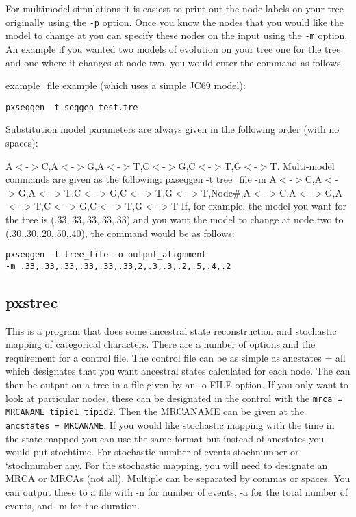 \documentclass[12pt,letterpaper]{memoir}
\begin{document}
For multimodel simulations it is easiest to print out the node labels on your tree originally using the \texttt{-p} option. Once you know the nodes that you would like the model to change at you can specify these nodes on the input using the \texttt{-m} option. An example if you wanted two models of evolution on your tree one for the tree and one where it changes at node two, you would enter the command as follows.


\begin{flushleft}
example\_file example (which uses a simple JC69 model):
\begin{verbatim}
pxseqgen -t seqgen_test.tre
\end{verbatim}

Substitution model parameters are always given in the following order (with no spaces):

A$<$-$>$C,A$<$-$>$G,A$<$-$>$T,C$<$-$>$G,C$<$-$>$T,G$<$-$>$T.
\newline
\newline
Multi-model commands are given as the following:
pxseqgen -t tree\_file -m A$<$-$>$C,A$<$-$>$G,A$<$-$>$T,C$<$-$>$G,C$<$-$>$T,G$<$-$>$T,Node\#,A$<$-$>$C,A$<$-$>$G,A$<$-$>$T,C$<$-$>$G,C$<$-$>$T,G$<$-$>$T
\newline
\newline
If, for example, the model you want for the tree is (.33,.33,.33,.33,.33) and you want the model to change at node two to (.30,.30,.20,.50,.40), the command would be as follows: 

\begin{verbatim}
pxseqgen -t tree_file -o output_alignment 
-m .33,.33,.33,.33,.33,.33,2,.3,.3,.2,.5,.4,.2
\end{verbatim}
\end{flushleft}

\subsection{pxstrec}

This is a program that does some ancestral state reconstruction and stochastic mapping of categorical characters. There are a number of options and the requirement for a control file. The control file can be as simple as ancstates = all which designates that you want ancestral states calculated for each node. The can then be output on a tree in a file given by an -o FILE option. If you only want to look at particular nodes, these can be designated in the control with the \texttt{mrca = MRCANAME tipid1 tipid2}. Then the MRCANAME can be given at the \texttt{ancstates = MRCANAME}. If you would like stochastic mapping with the time in the state mapped you can use the same format but instead of ancstates you would put stochtime. For stochastic number of events stochnumber or `stochnumber any. For the stochastic mapping, you will need to designate an MRCA or MRCAs (not all). Multiple can be separated by commas or spaces. You can output these to a file with -n for number of events, -a for the total number of events, and -m for the duration. 
\end{document}

